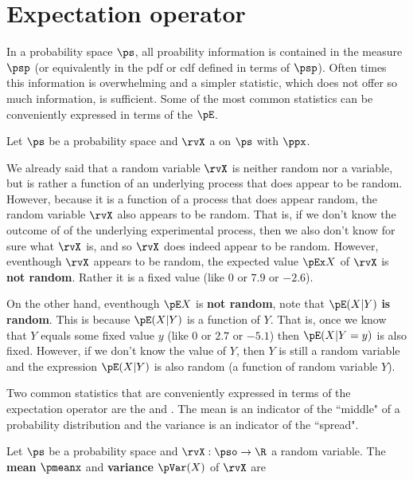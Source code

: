 \section{Expectation operator}
In a probability space $\ps$, all proability information
is contained in the measure $\psp$ (or equivalently in the pdf or cdf
defined in terms of $\psp$).
Often times this information is overwhelming and a simpler statistic,
which does not offer so much information, is sufficient.
Some of the most common statistics can be conveniently expressed in terms
of the  $\pE$.
\begin{definition}
\label{def:pE}
Let $\ps$ be a probability space and
$\rvX$ a  on $\ps$ with
 $\ppx$.
\end{definition}

We already said that a random variable $\rvX$ is neither random nor a variable,
but is rather a function of an underlying process that does appear to be random.
However, because it is a function of a process that does appear random,
the random variable $\rvX$ also appears to be random.
That is, if we don't know the outcome of of the underlying experimental
process, then we also don't know for sure what $\rvX$ is, and so $\rvX$ does
indeed appear to be random.
However, eventhough $\rvX$ appears to be random,
the expected value $\pEx X$  of $\rvX$ is {\bf not random}.
Rather it is a fixed value (like $0$ or $7.9$ or $-2.6$).

On the other hand, eventhough $\pE X$ is {\bf not random},
note that $\pE(X|Y)$ {\bf is random}.
This is because $\pE(X|Y)$ is a function of $Y$.
That is, once we know that $Y$ equals some fixed value $y$
(like $0$ or $2.7$ or $-5.1$) then $\pE(X|Y=y)$ is also fixed.
However, if we don't know the value of $Y$,
then $Y$ is still a random variable and the expression $\pE(X|Y)$
is also random (a function of random variable $Y$).

Two common statistics that are conveniently expressed in terms of the
expectation operator are the  and .
The mean is an indicator of the ``middle" of a probability distribution and the
variance is an indicator of the ``spread".
\begin{definition}
\label{def:Mx}
Let $\ps$ be a probability space and $\rvX:\pso\to\R$ a random variable.
The {\bf mean} $\pmeanx$ and {\bf variance} $\pVar(X)$ of $\rvX$ are
\end{definition}

